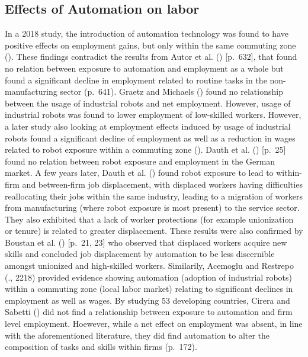 \documentclass[
  11,
  a4paperpaper,
]{article}
\begin{document}
\subsection{Effects of Automation on
labor}\label{effects-of-automation-on-labor}

In a 2018 study, the introduction of automation technology was found to
have positive effects on employment gains, but only within the same
commuting zone (). These findings contradict the results from Autor et al.
() {[}p.~632{]}, that found no
relation between exposure to automation and employment as a whole but
found a significant decline in employment related to routine tasks in
the non-manufacturing sector (p.~641). Graetz and Michaels
() found no relationship
between the usage of industrial robots and net employment. However,
usage of industrial robots was found to lower employment of low-skilled
workers. However, a later study also looking at employment effects
induced by usage of industrial robots found a significant decline of
employment as well as a reduction in wages related to robot exposure
within a commuting zone (). Dauth et al.
() {[}p.~25{]} found no relation
between robot exposure and employment in the German market. A few years
later, Dauth et al. () found robot exposure to lead to within-firm and between-firm
job displacement, with displaced workers having difficulties
reallocating their jobs within the same industry, leading to a migration
of workers from manufacturing (where robot exposure is most present) to
the service sector. They also exhibited that a lack of worker
protections (for example unionization or tenure) is related to greater
displacement. These results were also confirmed by Boustan et al.
() {[}p.~21, 23{]} who
observed that displaced workers acquire new skills and concluded job
displacement by automation to be less discernible amongst unionized and
high-skilled workers. Similarily, Acemoglu and Restrepo
(., 2218) provided
evidence showing automation (adoption of industrial robots) within a
commuting zone (local labor market) relating to significant declines in
employment as well as wages. By studying 53 developing countries, Cirera
and Sabetti () did not
find a relationship between exposure to automation and firm level
employment. Hoewever, while a net effect on employment was absent, in
line with the aforementioned literature, they did find automation to
alter the composition of tasks and skills within firms (p.~172).
\end{document}
